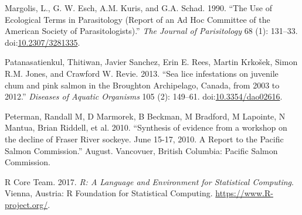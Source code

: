 \documentclass[fleqn,10pt]{wlpeerj} %
\begin{document}
\hypertarget{ref-Margolis1990}{}
Margolis, L., G. W. Esch, A.M. Kuris, and G.A. Schad. 1990. ``The Use of
Ecological Terms in Parasitology (Report of an Ad Hoc Committee of the
American Society of Parasitologists).'' \emph{The Journal of
Parisitology} 68 (1): 131--33.
doi:\href{https://doi.org/10.2307/3281335}{10.2307/3281335}.

\hypertarget{ref-Patanasatienkul2013}{}
Patanasatienkul, Thitiwan, Javier Sanchez, Erin E. Rees, Martin Krkošek,
Simon R.M. Jones, and Crawford W. Revie. 2013. ``Sea lice infestations
on juvenile chum and pink salmon in the Broughton Archipelago, Canada,
from 2003 to 2012.'' \emph{Diseases of Aquatic Organisms} 105 (2):
149--61. doi:\href{https://doi.org/10.3354/dao02616}{10.3354/dao02616}.

\hypertarget{ref-Peterman2010}{}
Peterman, Randall M, D Marmorek, B Beckman, M Bradford, M Lapointe, N
Mantua, Brian Riddell, et al. 2010. ``Synthesis of evidence from a
workshop on the decline of Fraser River sockeye. June 15-17, 2010. A
Report to the Pacific Salmon Commission.'' August. Vancovuer, British
Columbia: Pacific Salmon Commission.

\hypertarget{ref-R}{}
R Core Team. 2017. \emph{R: A Language and Environment for Statistical
Computing}. Vienna, Austria: R Foundation for Statistical Computing.
\url{https://www.R-project.org/}.
\end{document}

